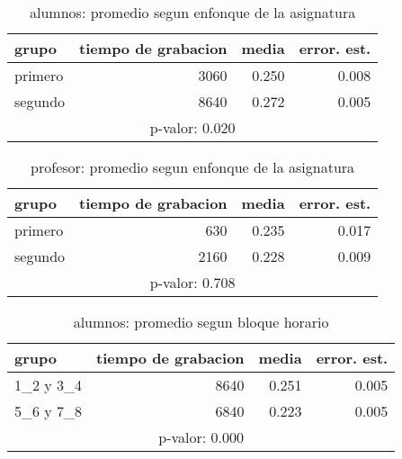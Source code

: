 \documentclass[spanish]{article}
\begin{document}
\begin{table}[h!]
\begin{center}
\begin{tabular}{|l|r|r|r|}
\hline
grupo   & tiempo de grabacion & media          & error. est.     \\ \hline
primero &                3060 &          0.250 &            0.008\\ \hline
segundo &                8640 &          0.272 &            0.005\\ \hline
\multicolumn{4}{|c|}{p-valor: 0.020} \\ \hline
\end{tabular}
\caption{alumnos: promedio segun enfonque de la asignatura}
\end{center}
\end{table}

\begin{table}[h!]
\begin{center}
\begin{tabular}{|l|r|r|r|}
\hline
grupo   & tiempo de grabacion & media          & error. est.     \\ \hline
primero &                 630 &          0.235 &            0.017\\ \hline
segundo &                2160 &          0.228 &            0.009\\ \hline
\multicolumn{4}{|c|}{p-valor: 0.708} \\ \hline
\end{tabular}
\caption{profesor: promedio segun enfonque de la asignatura}
\end{center}
\end{table}

\begin{table}[h!]
\begin{center}
\begin{tabular}{|l|r|r|r|}
\hline
grupo     & tiempo de grabacion & media          & error. est.     \\ \hline
1\_2 y 3\_4 &                8640 &          0.251 &            0.005\\ \hline
5\_6 y 7\_8 &                6840 &          0.223 &            0.005\\ \hline
\multicolumn{4}{|c|}{p-valor: 0.000} \\ \hline
\end{tabular}
\caption{alumnos: promedio segun bloque horario}
\end{center}
\end{table}
\end{document}
